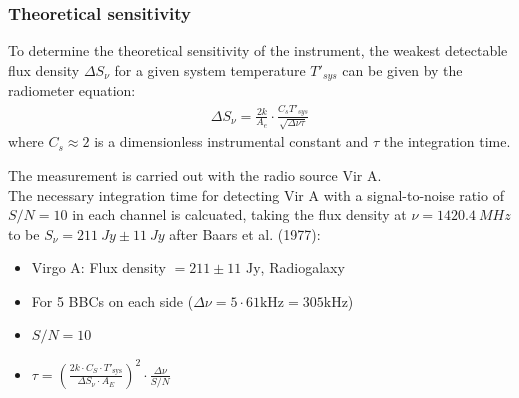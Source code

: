 \documentclass[10pt,a4paper, bibliography=totoc]{scrartcl}
\begin{document}
\subsubsection{Theoretical sensitivity}
To determine the theoretical sensitivity of the instrument, the weakest detectable flux density $\Delta S_\nu$ for a given system temperature $T'_{sys}$ can be given by the radiometer equation:
\begin{align}
\label{eq: radiometer}
\Delta S_\nu=\frac{2k}{A_e}\cdot\frac{C_sT'_{sys}}{\sqrt{\Delta\nu\tau}}
\end{align}
where $C_s\approx 2$ is a dimensionless instrumental constant and $\tau$ the integration time. 

The measurement is carried out with the radio source Vir A.\\
The necessary integration time for detecting Vir A with a signal-to-noise ratio of $S/N=10$ in each channel is calcuated, taking the flux density at $\nu=\qty{1420.4}{MHz}$ to be $S_\nu=\qty{211}{Jy}\pm\qty{11}{Jy}$ after Baars et al. (1977):
\begin{itemize}
\label{eq: int time}
    \item Virgo A: Flux density $= 211 \pm 11 \text{ Jy}$, Radiogalaxy
    \item For 5 BBCs on each side ($\Delta \nu = 5 \cdot 61\text{kHz} = 305\text{kHz}$)
    \item $S/N = 10$
    \item $\tau = \left( \frac{2k\cdot C_{S}\cdot T'_{\text{sys}}}{\Delta S_{\nu}\cdot A_{E}} \right)^{2} \cdot \frac{\Delta\nu}{S/N}$
\end{itemize}
\end{document}
